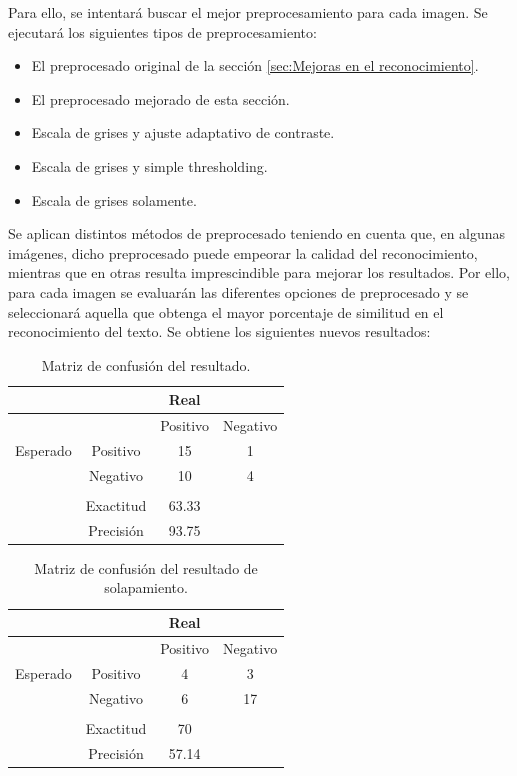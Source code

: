 Para ello, se intentará buscar el mejor preprocesamiento para cada imagen. Se ejecutará los siguientes tipos de preprocesamiento:
\begin{itemize}
	\item El preprocesado original de la sección \ref{sec:Mejoras en el reconocimiento}.
	\item El preprocesado mejorado de esta sección.
	\item Escala de grises y ajuste adaptativo de contraste.
	\item Escala de grises y simple thresholding.
	\item Escala de grises solamente.
\end{itemize}
Se aplican distintos métodos de preprocesado teniendo en cuenta que, en algunas imágenes, dicho preprocesado puede empeorar la calidad del reconocimiento, mientras que en otras resulta imprescindible para mejorar los resultados. Por ello, para cada imagen se evaluarán las diferentes opciones de preprocesado y se seleccionará aquella que obtenga el mayor porcentaje de similitud en el reconocimiento del texto.
Se obtiene los siguientes nuevos resultados:
\begin{table}[H]
	\centering
	\begin{tabular}{|c|c|c|c|}
		\hline
		& & Real &   \\
		\hline
		&          & Positivo & Negativo                   \\
		\hline
		Esperado & Positivo & 15& 1 \\
		\hline
		& Negativo & 		  10& 4                \\
		\hline
		&&&\\
		\hline
		&Exactitud& 63.33 & \\
		\hline
		&Precisión& 93.75 &\\
		\hline
	\end{tabular}
	\caption{Matriz de confusión del resultado.}
	\label{table:mt_n}
\end{table}
\begin{table}[H]
	\centering
	\begin{tabular}{|c|c|c|c|}
		\hline
		& & Real &   \\
		\hline
		&          & Positivo & Negativo                   \\
		\hline
		Esperado & Positivo & 4& 3 \\
		\hline
		& Negativo & 		  6& 17                \\
		\hline
		&&&\\
		\hline
		&Exactitud& 70 & \\
		\hline
		&Precisión& 57.14 &\\
		\hline
	\end{tabular}
	\caption{Matriz de confusión del resultado de solapamiento.}
	\label{table:mt_sol_n}
\end{table}

